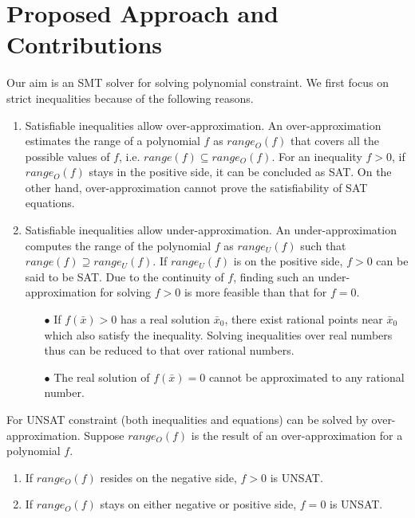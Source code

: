 \section{Proposed Approach and Contributions}
Our aim is an SMT solver for solving polynomial constraint. We first focus on strict inequalities because of the following reasons.
\begin{enumerate}
\item
Satisfiable inequalities allow over-approximation. An over-approximation estimates the range of a polynomial $f$ as $range_O(f)$ that covers all the possible values of $f$, i.e. $range(f) \subseteq range_O(f)$. For an inequality $f>0$, if $range_O(f)$ stays in the positive side, it can be concluded as SAT. On the other hand, over-approximation cannot prove the satisfiability of SAT equations.
\item
Satisfiable inequalities allow under-approximation. An under-approximation computes the range of the polynomial $f$ as  $range_U(f)$ such that $range(f) \supseteq range_U(f)$. If $range_U(f)$ is on the positive side, $f > 0$ can be said to be SAT. Due to the continuity of $f$, finding such an under-approximation for solving $f > 0$ is more feasible than that for $f = 0$.
\begin{itemize}
\item[$\bullet$] If $f(\bar{x}) > 0$ has a real solution $\bar{x}_0$, there exist rational points near $\bar{x}_0$ which also satisfy the inequality. Solving inequalities over real numbers thus can be reduced to that over rational numbers.
\item[$\bullet$] The real solution of $f(\bar{x}) = 0$ cannot be approximated to any rational number.
\end{itemize}
\end{enumerate}
For UNSAT constraint (both inequalities and equations) can be solved by over-approximation. Suppose $range_O(f)$ is the result of an over-approximation for a polynomial $f$.
\begin{enumerate}
\item If $range_O(f)$ resides on the negative side, $f > 0$ is UNSAT.
\item If $range_O(f)$ stays on either negative or positive side, $f = 0$ is UNSAT.
\end{enumerate}

